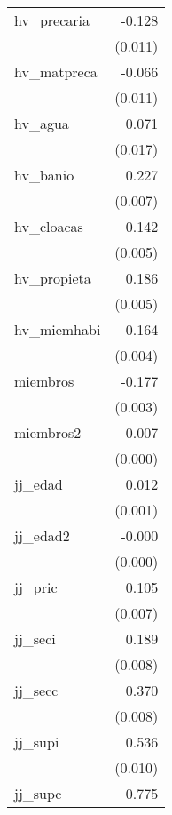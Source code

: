 {\begin{longtable}{l*{1}{D{.}{.}{-1}}}
hv\_precaria &      -0.128\sym{***}\\
            &     (0.011)         \\
\addlinespace
hv\_matpreca &      -0.066\sym{***}\\
            &     (0.011)         \\
\addlinespace
hv\_agua     &       0.071\sym{***}\\
            &     (0.017)         \\
\addlinespace
hv\_banio    &       0.227\sym{***}\\
            &     (0.007)         \\
\addlinespace
hv\_cloacas  &       0.142\sym{***}\\
            &     (0.005)         \\
\addlinespace
hv\_propieta &       0.186\sym{***}\\
            &     (0.005)         \\
\addlinespace
hv\_miemhabi &      -0.164\sym{***}\\
            &     (0.004)         \\
\addlinespace
miembros    &      -0.177\sym{***}\\
            &     (0.003)         \\
\addlinespace
miembros2   &       0.007\sym{***}\\
            &     (0.000)         \\
\addlinespace
jj\_edad     &       0.012\sym{***}\\
            &     (0.001)         \\
\addlinespace
jj\_edad2    &      -0.000\sym{***}\\
            &     (0.000)         \\
\addlinespace
jj\_pric     &       0.105\sym{***}\\
            &     (0.007)         \\
\addlinespace
jj\_seci     &       0.189\sym{***}\\
            &     (0.008)         \\
\addlinespace
jj\_secc     &       0.370\sym{***}\\
            &     (0.008)         \\
\addlinespace
jj\_supi     &       0.536\sym{***}\\
            &     (0.010)         \\
\addlinespace
jj\_supc     &       0.775\sym{***}\\

\end{longtable}}
